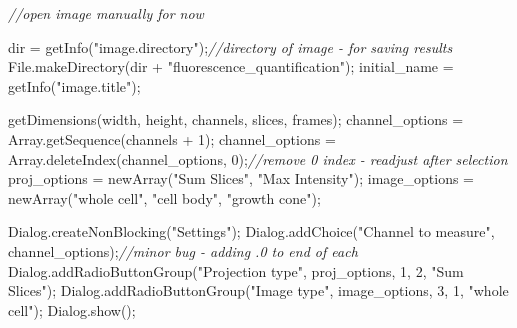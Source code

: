 \documentclass[
  12pt,
  a4paper,
]{book}
\newenvironment{Shaded}{}{}
\newcommand{\CommentTok}[1]{\textcolor[rgb]{0.38,0.63,0.69}{\textit{#1}}}
\newcommand{\DecValTok}[1]{\textcolor[rgb]{0.25,0.63,0.44}{#1}}
\newcommand{\NormalTok}[1]{#1}
\newcommand{\OperatorTok}[1]{\textcolor[rgb]{0.40,0.40,0.40}{#1}}
\newcommand{\StringTok}[1]{\textcolor[rgb]{0.25,0.44,0.63}{#1}}
\begin{document}
\begin{Shaded}
\begin{Highlighting}[]
\CommentTok{//open image manually for now}

\NormalTok{dir }\OperatorTok{=}\NormalTok{ getInfo}\OperatorTok{(}\StringTok{"image.directory"}\OperatorTok{);}\CommentTok{//directory of image {-} for saving results}
\NormalTok{File}\OperatorTok{.}\NormalTok{makeDirectory}\OperatorTok{(}\NormalTok{dir }\OperatorTok{+} \StringTok{"fluorescence\_quantification"}\OperatorTok{);}
\NormalTok{initial\_name }\OperatorTok{=}\NormalTok{ getInfo}\OperatorTok{(}\StringTok{"image.title"}\OperatorTok{);}

\NormalTok{getDimensions}\OperatorTok{(}\NormalTok{width}\OperatorTok{,}\NormalTok{ height}\OperatorTok{,}\NormalTok{ channels}\OperatorTok{,}\NormalTok{ slices}\OperatorTok{,}\NormalTok{ frames}\OperatorTok{);}
\NormalTok{channel\_options }\OperatorTok{=}\NormalTok{ Array}\OperatorTok{.}\NormalTok{getSequence}\OperatorTok{(}\NormalTok{channels }\OperatorTok{+} \DecValTok{1}\OperatorTok{);}
\NormalTok{channel\_options }\OperatorTok{=}\NormalTok{ Array}\OperatorTok{.}\NormalTok{deleteIndex}\OperatorTok{(}\NormalTok{channel\_options}\OperatorTok{,} \DecValTok{0}\OperatorTok{);}\CommentTok{//remove 0 index {-} readjust after selection}
\NormalTok{proj\_options }\OperatorTok{=}\NormalTok{ newArray}\OperatorTok{(}\StringTok{"Sum Slices"}\OperatorTok{,} \StringTok{"Max Intensity"}\OperatorTok{);}
\NormalTok{image\_options }\OperatorTok{=}\NormalTok{ newArray}\OperatorTok{(}\StringTok{"whole cell"}\OperatorTok{,} \StringTok{"cell body"}\OperatorTok{,} \StringTok{"growth cone"}\OperatorTok{);}

\NormalTok{Dialog}\OperatorTok{.}\NormalTok{createNonBlocking}\OperatorTok{(}\StringTok{"Settings"}\OperatorTok{);}
\NormalTok{Dialog}\OperatorTok{.}\NormalTok{addChoice}\OperatorTok{(}\StringTok{"Channel to measure"}\OperatorTok{,}\NormalTok{ channel\_options}\OperatorTok{);}\CommentTok{//minor bug {-} adding .0 to end of each}
\NormalTok{Dialog}\OperatorTok{.}\NormalTok{addRadioButtonGroup}\OperatorTok{(}\StringTok{"Projection type"}\OperatorTok{,}\NormalTok{ proj\_options}\OperatorTok{,} \DecValTok{1}\OperatorTok{,} \DecValTok{2}\OperatorTok{,} \StringTok{"Sum Slices"}\OperatorTok{);}
\NormalTok{Dialog}\OperatorTok{.}\NormalTok{addRadioButtonGroup}\OperatorTok{(}\StringTok{"Image type"}\OperatorTok{,}\NormalTok{ image\_options}\OperatorTok{,} \DecValTok{3}\OperatorTok{,} \DecValTok{1}\OperatorTok{,} \StringTok{"whole cell"}\OperatorTok{);}
\NormalTok{Dialog}\OperatorTok{.}\NormalTok{show}\OperatorTok{();}


\end{Highlighting}
\end{Shaded}
\end{document}
